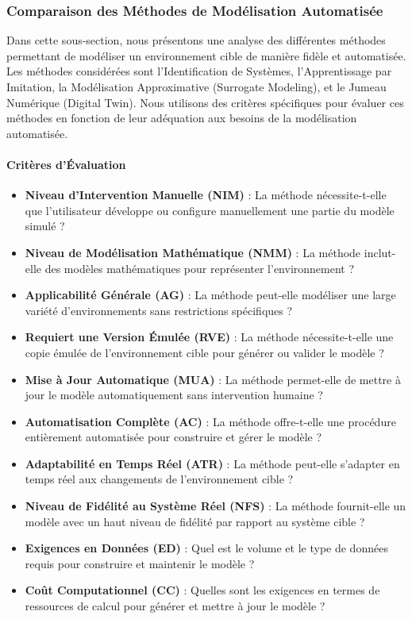 \documentclass[sigconf,anonymous]{aamas}
\begin{document}
\subsubsection{Comparaison des Méthodes de Modélisation Automatisée}

Dans cette sous-section, nous présentons une analyse des différentes méthodes permettant de modéliser un environnement cible de manière fidèle et automatisée. Les méthodes considérées sont l'Identification de Systèmes, l'Apprentissage par Imitation, la Modélisation Approximative (Surrogate Modeling), et le Jumeau Numérique (Digital Twin). Nous utilisons des critères spécifiques pour évaluer ces méthodes en fonction de leur adéquation aux besoins de la modélisation automatisée.

\paragraph{Critères d'Évaluation}

\begin{itemize}
    \item \textbf{Niveau d'Intervention Manuelle (NIM)} : La méthode nécessite-t-elle que l'utilisateur développe ou configure manuellement une partie du modèle simulé ?
    \item \textbf{Niveau de Modélisation Mathématique (NMM)} : La méthode inclut-elle des modèles mathématiques pour représenter l'environnement ?
    \item \textbf{Applicabilité Générale (AG)} : La méthode peut-elle modéliser une large variété d'environnements sans restrictions spécifiques ?
    \item \textbf{Requiert une Version Émulée (RVE)} : La méthode nécessite-t-elle une copie émulée de l'environnement cible pour générer ou valider le modèle ?
    \item \textbf{Mise à Jour Automatique (MUA)} : La méthode permet-elle de mettre à jour le modèle automatiquement sans intervention humaine ?
    \item \textbf{Automatisation Complète (AC)} : La méthode offre-t-elle une procédure entièrement automatisée pour construire et gérer le modèle ?
    \item \textbf{Adaptabilité en Temps Réel (ATR)} : La méthode peut-elle s'adapter en temps réel aux changements de l'environnement cible ?
    \item \textbf{Niveau de Fidélité au Système Réel (NFS)} : La méthode fournit-elle un modèle avec un haut niveau de fidélité par rapport au système cible ?
    \item \textbf{Exigences en Données (ED)} : Quel est le volume et le type de données requis pour construire et maintenir le modèle ?
    \item \textbf{Coût Computationnel (CC)} : Quelles sont les exigences en termes de ressources de calcul pour générer et mettre à jour le modèle ?
\end{itemize}
\end{document}
